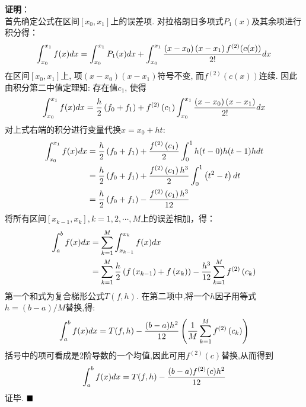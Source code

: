 \documentclass[UTF8]{ctexart}
\begin{document}
\textbf{证明}：\\
首先确定公式在区间$[x_0,x_1]$上的误差项. 对拉格朗日多项式$P_{1}(x)$及其余项进行积分得：
\begin{align}
	\int_{x_{0}}^{x_{1}} f(x) d x=\int_{x_{0}}^{x_{1}} P_{1}(x) d x+\int_{x_{0}}^{x_{1}} \frac{\left(x-x_{0}\right)\left(x-x_{1}\right) f^{(2)}(c(x))}{2 !} d x \notag
\end{align}
在区间$[x_0,x_1]$上, 项$\left(x-x_{0}\right)\left(x-x_{1}\right)$符号不变, 而$f^{(2)}(c(x))$连续. 因此由积分第二中值定理知: 存在值$c_1$, 使得
\begin{align}
	\int_{x_{0}}^{x_{1}} f(x) d x=\frac{h}{2}\left(f_{0}+f_{1}\right)+f^{(2)}\left(c_{1}\right) \int_{x_{0}}^{x_{1}} \frac{\left(x-x_{0}\right)\left(x-x_{1}\right)}{2 !} d x \notag
\end{align}
对上式右端的积分进行变量代换$x=x_0 + ht$:
\begin{align}
	\begin{aligned}
	\int_{x_{0}}^{x_{1}} f(x) d x &=\frac{h}{2}\left(f_{0}+f_{1}\right)+\frac{f^{(2)}\left(c_{1}\right)}{2} \int_{0}^{1} h(t-0) h(t-1) h d t \\
	&=\frac{h}{2}\left(f_{0}+f_{1}\right)+\frac{f^{(2)}\left(c_{1}\right) h^{3}}{2} \int_{0}^{1}\left(t^{2}-t\right) d t \\
	&=\frac{h}{2}\left(f_{0}+f_{1}\right)-\frac{f^{(2)}\left(c_{1}\right) h^{3}}{12}
	\end{aligned}\notag
\end{align}
将所有区间$[x_{k-1},x_{k}], k=1,2,\cdots,M$上的误差相加，得：
\begin{align}
	\begin{aligned}
	\int_{a}^{b} f(x) d x &=\sum_{k=1}^{M} \int_{x_{k-1}}^{x_{k}} f(x) d x \\
	&=\sum_{k=1}^{M} \frac{h}{2}\left(f\left(x_{k-1}\right)+f\left(x_{k}\right)\right)-\frac{h^{3}}{12} \sum_{k=1}^{M} f^{(2)}\left(c_{k}\right)
	\end{aligned} \notag
\end{align}
第一个和式为复合梯形公式$T(f,h)$. 在第二项中,将一个$h$因子用等式$h=(b-a)/M$替换,得:
\begin{align}
	\int_{a}^{b} f(x) d x = T(f,h) - \frac{(b-a)h^{2}}{12} \left( \frac{1}{M} \sum_{k=1}^{M} f^{(2)}\left(c_{k}\right) \right) \notag
\end{align}
括号中的项可看成是2阶导数的一个均值,因此可用$f^{(2)}(c)$替换,从而得到
\begin{align}
	\int_{a}^{b} f(x) d x = T(f,h) - \frac{(b-a) f^{(2)}(c) h^{2}}{12} \notag
\end{align}
证毕. $\hfill\blacksquare$ 
\end{document}

